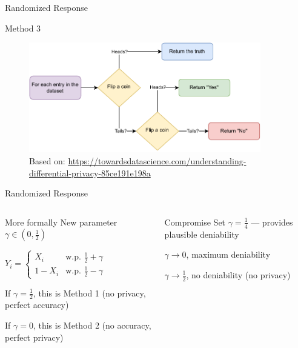 \documentclass[12pt,aspectratio=169]{beamer}
\begin{document}

\begin{frame}{Randomized Response}

\begin{block}{Method 3}
\begin{figure}
    \centering
    \includegraphics[width=0.9\textwidth]{figures/RR.pdf}
    \caption{\tiny Based on: \url{https://towardsdatascience.com/understanding-differential-privacy-85ce191e198a}}
\end{figure}
\end{block}

\end{frame}


\begin{frame}{Randomized Response}

\begin{columns}[T]

\begin{column}{.5\textwidth}

\begin{block}{More formally}
New parameter $\gamma \in (0, \frac{1}{2})$

$Y_i = \begin{cases} X_i & \text{w.p. } \frac{1}{2} + \gamma \\ 1 - X_i & \text{w.p. } \frac{1}{2} - \gamma \end{cases}$
\end{block}

If $\gamma = \frac{1}{2}$, this is Method 1 (no privacy, perfect accuracy)

If $\gamma = 0$, this is Method 2 (no accuracy, perfect privacy)

\end{column}

\begin{column}{.5\textwidth}

\begin{block}{Compromise}
Set $\gamma = \frac{1}{4}$ --- provides plausible deniability

$\gamma \rightarrow 0$, maximum deniability

$\gamma \rightarrow \frac{1}{2}$, no deniability (no privacy)
\end{block}

\end{column}
\end{columns}

\end{frame}
\end{document}
